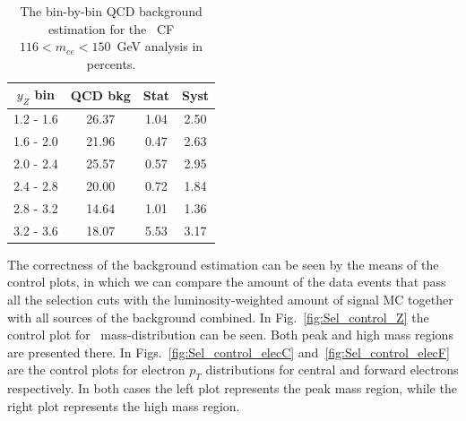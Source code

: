 \begin{table}
\centering
\begin{tabular}{ cccc } \hline \hline
 $y_Z$ bin & QCD bkg & Stat & Syst \\  \hline
 1.2 -  1.6 &  26.37 &   1.04  &   2.50 \\
 1.6 -  2.0 &  21.96 &   0.47  &   2.63 \\
 2.0 -  2.4 &  25.57 &   0.57  &   2.95 \\
 2.4 -  2.8 &  20.00 &   0.72  &   1.84 \\
 2.8 -  3.2 &  14.64 &   1.01  &   1.36 \\
 3.2 -  3.6 &  18.07 &   5.53  &   3.17 \\
\hline \hline
\end{tabular}
\caption{The bin-by-bin QCD background estimation for the \Zee\ CF $116 < m_{ee} < 150$~GeV analysis in percents.}
\label{tab:bkg_qcd_high_percents}
\end{table}

The correctness of the background estimation can be seen by the means of the control plots, in which we can compare the amount of the data events that pass all the selection cuts with the luminosity-weighted amount of signal MC together with all sources of the background combined. In Fig.~\ref{fig:Sel_control_Z} the control plot for \Zee\ mass-distribution can be seen. Both peak and high mass regions are presented there. In Figs.~\ref{fig:Sel_control_elecC} and~\ref{fig:Sel_control_elecF} are the control plots for electron $p_T$ distributions for central and forward electrons respectively. In both cases the left plot represents the peak mass region, while the right plot represents the high mass region.

\begin{figure}
\end{figure}

